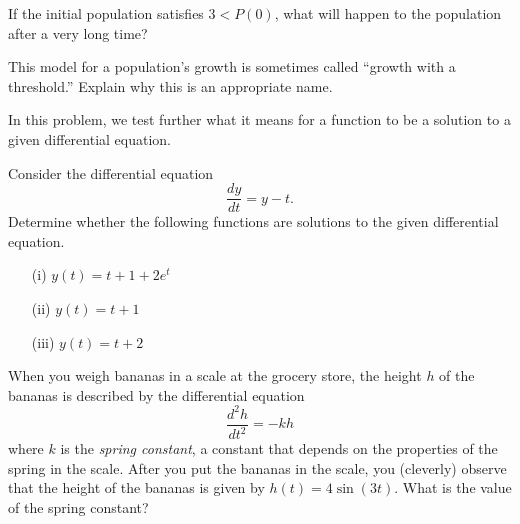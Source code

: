 \begin{exercises}
      \item If the initial population satisfies $3<P(0)$, what will
      happen to the population after a very long time?

      \item  This model for a population's growth is sometimes called
      ``growth with a threshold.''  Explain why this is an appropriate
      name.  

\ea

  \item In this problem, we test further what it means for a function to be a solution to a given differential equation.
  \ba
  	\item Consider the differential equation
      $$
      \frac{dy}{dt} = y - t.
      $$
      Determine whether the following functions are solutions to the given differential equation.

      \begin{itemize}
 	\item[(i)] $y(t) = t + 1 + 2e^t$
	\item[(ii)] $y(t) = t + 1$
	\item[(iii)] $y(t) = t + 2$
       \end{itemize}

	\item   When you weigh bananas in a scale at the grocery store, the
      height $h$ of the bananas is described by the differential
      equation
      $$
      \frac{d^2h}{dt^2} = -kh
      $$
      where $k$ is the {\em spring constant}, a constant that depends
      on the properties of the spring in the scale.  After you put the
      bananas in the scale, you (cleverly) observe that the height of the bananas
      is given by $h(t) = 4\sin(3t)$.  What is the value of the spring
      constant? 
    \ea
        
\end{exercises}
\afterexercises
